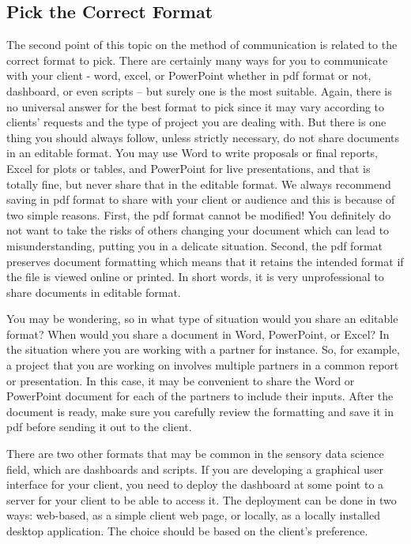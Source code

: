 \documentclass[
]{krantz}
\begin{document}
\hypertarget{pick-the-correct-format}{%
\subsection{Pick the Correct Format}\label{pick-the-correct-format}}

The second point of this topic on the method of communication is related to the correct format to pick. There are certainly many ways for you to communicate with your client - word, excel, or PowerPoint whether in pdf format or not, dashboard, or even scripts -- but surely one is the most suitable. Again, there is no universal answer for the best format to pick since it may vary according to clients' requests and the type of project you are dealing with. But there is one thing you should always follow, unless strictly necessary, do not share documents in an editable format. You may use Word to write proposals or final reports, Excel for plots or tables, and PowerPoint for live presentations, and that is totally fine, but never share that in the editable format. We always recommend saving in pdf format to share with your client or audience and this is because of two simple reasons. First, the pdf format cannot be modified! You definitely do not want to take the risks of others changing your document which can lead to misunderstanding, putting you in a delicate situation. Second, the pdf format preserves document formatting which means that it retains the intended format if the file is viewed online or printed. In short words, it is very unprofessional to share documents in editable format.

You may be wondering, so in what type of situation would you share an editable format? When would you share a document in Word, PowerPoint, or Excel? In the situation where you are working with a partner for instance. So, for example, a project that you are working on involves multiple partners in a common report or presentation. In this case, it may be convenient to share the Word or PowerPoint document for each of the partners to include their inputs. After the document is ready, make sure you carefully review the formatting and save it in pdf before sending it out to the client.

There are two other formats that may be common in the sensory data science field, which are dashboards and scripts. If you are developing a graphical user interface for your client, you need to deploy the dashboard at some point to a server for your client to be able to access it. The deployment can be done in two ways: web-based, as a simple client web page, or locally, as a locally installed desktop application. The choice should be based on the client's preference.
\end{document}
